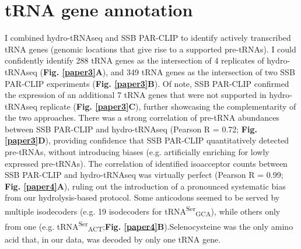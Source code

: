 \documentclass[12pt]{rockefeller}
\begin{document}
\section{tRNA gene annotation}
I combined hydro-tRNAseq and SSB PAR-CLIP to identify actively transcribed tRNA genes (genomic locations that give rise to a supported pre-tRNAs). I could confidently identify 288 tRNA genes as the intersection of 4 replicates of hydro-tRNAseq (\textbf{Fig. \ref{paper3}A}), and 349 tRNA genes as the intersection of two SSB PAR-CLIP experiments (\textbf{Fig. \ref{paper3}B}). Of note, SSB PAR-CLIP confirmed the expression of an additional 7 tRNA genes that were not supported in hydro-tRNAseq replicate (\textbf{Fig. \ref{paper3}C}), further showcasing the complementarity of the two approaches. There was a strong correlation of pre-tRNA abundances between SSB PAR-CLIP and hydro-tRNAseq (Pearson R = 0.72; \textbf{Fig. \ref{paper3}D}), providing confidence that SSB PAR-CLIP quantitatively detected pre-tRNAs, without introducing biases (e.g. artificially enriching for lowly expressed pre-tRNAs). The correlation of identified isoacceptor counts between SSB PAR-CLIP and hydro-tRNAseq was virtually perfect (Pearson R = 0.99; \textbf{Fig. \ref{paper4}A}), ruling out the introduction of a pronounced systematic bias from our hydrolysis-based protocol. Some anticodons seemed to be served by multiple \gls{isodecoders} (e.g. 19 isodecoders for tRNA\textsuperscript{Ser}\textsubscript{GCA}), while others only from one (e.g. tRNA\textsuperscript{Ser}\textsubscript{ACT};\textbf{Fig. \ref{paper4}B}).Selenocysteine was the only amino acid that, in our data, was decoded by only one tRNA gene.
\end{document}
